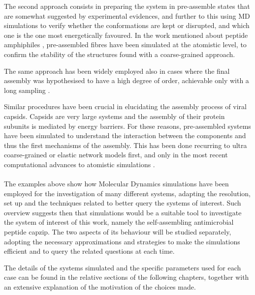 The second approach consists in preparing the system in pre-assemble states that are somewhat suggested by experimental evidences, and further to this using MD simulations to verify whether the conformations are kept or disrupted, and which one is the one most energetically favoured. 
%
In the work mentioned about peptide amphiphiles \citep{Lee2012}, pre-assembled fibres have been simulated at the atomistic level, to confirm the stability of the structures found with a coarse-grained approach.

The same approach has been widely employed also in cases where the final assembly was hypothesised to have a high degree of order, achievable only with a long sampling \citep{Gudlur2012}.

Similar procedures have been crucial in elucidating the assembly process of viral capsids. Capsids are very large systems and the assembly of their protein subunits is mediated by energy barriers. For these reasons, pre-assembled systems have been simulated to understand the interaction between the components and thus the first mechanisms of the assembly. This has been done recurring to ultra coarse-grained or elastic network models \citep{Grime2016,AbiMansour2014} first, and only in the most recent computational advances to atomistic simulations \citep{Perilla2016,Hadden2018,AbiMansour2014}.


\paragraph{}
The examples above show how Molecular Dynamics simulations have been employed for the investigation of many different systems, adapting the resolution, set up and the techniques related to better query the systems of interest. Such overview suggests then that simulations would be a suitable tool to investigate the system of interest of this work, namely the self-assembling antimicrobial peptide capzip. The two aspects of its behaviour will be studied separately, adopting the necessary approximations and strategies to make the simulations efficient and to query the related questions at each time.

The details of the systems simulated and the specific parameters used for each case can be found in the relative sections of the following chapters, together with an extensive explanation of the motivation of the choices made.
